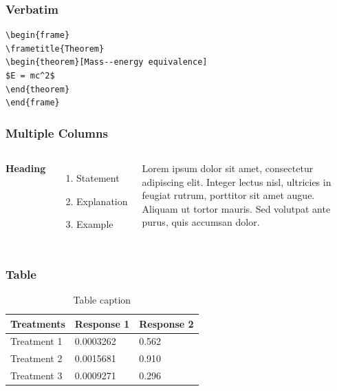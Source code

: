 \documentclass[10pt]{beamer}
\begin{document}
\iffalse

\begin{frame}[fragile] %
\frametitle{Verbatim}
\begin{example}
\begin{verbatim}
\begin{frame}
\frametitle{Theorem}
\begin{theorem}[Mass--energy equivalence]
$E = mc^2$
\end{theorem}
\end{frame}\end{verbatim}
\end{example}
\end{frame}

\begin{frame}
\frametitle{Multiple Columns}
\begin{columns}[c] %

\textbf{Heading}
\begin{enumerate}
\item Statement
\item Explanation
\item Example
\end{enumerate}

Lorem ipsum dolor sit amet, consectetur adipiscing elit. Integer lectus nisl, ultricies in feugiat rutrum, porttitor sit amet augue. Aliquam ut tortor mauris. Sed volutpat ante purus, quis accumsan dolor.

\end{columns}
\end{frame}

\begin{frame}
\frametitle{Table}
\begin{table}
\begin{tabular}{l l l}
\toprule
\textbf{Treatments} & \textbf{Response 1} & \textbf{Response 2}\\
\midrule
Treatment 1 & 0.0003262 & 0.562 \\
Treatment 2 & 0.0015681 & 0.910 \\
Treatment 3 & 0.0009271 & 0.296 \\
\bottomrule
\end{tabular}
\caption{Table caption}
\end{table}
\end{frame}
\end{document}
